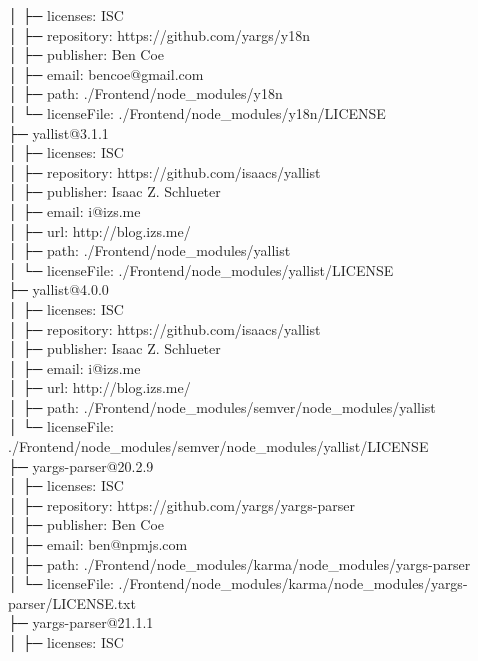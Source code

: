 \documentclass[
    paper=a4,
    twoside=false,
    parskip=half,
    listof=entryprefix,
    listof=totoc,
    index=totoc,
    bibliography=totoc,
    headsepline,
]{scrbook}
\begin{document}
    │  ├─ licenses: ISC\\
    │  ├─ repository: https://github.com/yargs/y18n\\
    │  ├─ publisher: Ben Coe\\
    │  ├─ email: bencoe@gmail.com\\
    │  ├─ path: ./Frontend/node\_modules/y18n\\
    │  └─ licenseFile: ./Frontend/node\_modules/y18n/LICENSE\\
    ├─ yallist@3.1.1\\
    │  ├─ licenses: ISC\\
    │  ├─ repository: https://github.com/isaacs/yallist\\
    │  ├─ publisher: Isaac Z. Schlueter\\
    │  ├─ email: i@izs.me\\
    │  ├─ url: http://blog.izs.me/\\
    │  ├─ path: ./Frontend/node\_modules/yallist\\
    │  └─ licenseFile: ./Frontend/node\_modules/yallist/LICENSE\\
    ├─ yallist@4.0.0\\
    │  ├─ licenses: ISC\\
    │  ├─ repository: https://github.com/isaacs/yallist\\
    │  ├─ publisher: Isaac Z. Schlueter\\
    │  ├─ email: i@izs.me\\
    │  ├─ url: http://blog.izs.me/\\
    │  ├─ path: ./Frontend/node\_modules/semver/node\_modules/yallist\\
    │  └─ licenseFile: ./Frontend/node\_modules/semver/node\_modules/yallist/LICENSE\\
    ├─ yargs-parser@20.2.9\\
    │  ├─ licenses: ISC\\
    │  ├─ repository: https://github.com/yargs/yargs-parser\\
    │  ├─ publisher: Ben Coe\\
    │  ├─ email: ben@npmjs.com\\
    │  ├─ path: ./Frontend/node\_modules/karma/node\_modules/yargs-parser\\
    │  └─ licenseFile: ./Frontend/node\_modules/karma/node\_modules/yargs-parser/LICENSE.txt\\
    ├─ yargs-parser@21.1.1\\
    │  ├─ licenses: ISC\\
\end{document}
